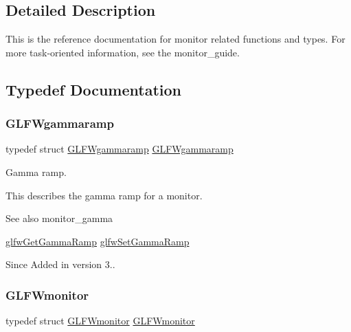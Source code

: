 \subsection{Detailed Description}
This is the reference documentation for monitor related functions and types. For more task-\/oriented information, see the monitor\+\_\+guide. 

\subsection{Typedef Documentation}
\mbox{\label{group__monitor_gaec0bd37af673be8813592849f13e02f0}} 
\subsubsection{\texorpdfstring{G\+L\+F\+Wgammaramp}{GLFWgammaramp}}
{\footnotesize\ttfamily typedef struct \hyperlink{structGLFWgammaramp}{G\+L\+F\+Wgammaramp}  \hyperlink{structGLFWgammaramp}{G\+L\+F\+Wgammaramp}}



Gamma ramp. 

This describes the gamma ramp for a monitor.

\begin{DoxySeeAlso}{See also}
monitor\+\_\+gamma 

\hyperlink{group__monitor_gaeeac9198f3c91b83440eed679441f76b}{glfw\+Get\+Gamma\+Ramp} \hyperlink{group__monitor_gac9f36a1cfa10eab191d3029ea8bc9558}{glfw\+Set\+Gamma\+Ramp}
\end{DoxySeeAlso}
\begin{DoxySince}{Since}
Added in version 3.. 
\end{DoxySince}
\mbox{\label{group__monitor_ga8d9efd1cde9426692c73fe40437d0ae3}} 
\subsubsection{\texorpdfstring{G\+L\+F\+Wmonitor}{GLFWmonitor}}
{\footnotesize\ttfamily typedef struct \hyperlink{group__monitor_ga8d9efd1cde9426692c73fe40437d0ae3}{G\+L\+F\+Wmonitor} \hyperlink{group__monitor_ga8d9efd1cde9426692c73fe40437d0ae3}{G\+L\+F\+Wmonitor}}



